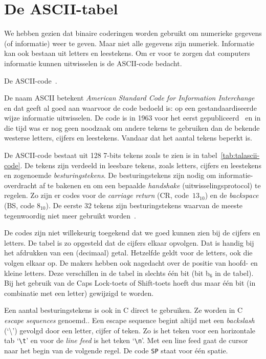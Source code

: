 \chapter{De ASCII-tabel}
\label{cha:asciitabel}
\thispagestyle{empty}

We hebben gezien dat binaire coderingen worden gebruikt om
numerieke gegevens (of informatie) weer te geven. Maar niet alle gegevens zijn numeriek.
Informatie kan ook bestaan uit letters en leestekens. Om er voor te zorgen dat
computers informatie kunnen uitwisselen is de ASCII-code bedacht.

\begin{table}[!p]
\caption{De ASCII-code~\cite{eijkhout2010ascii}.}
\label{tab:talascii-code}

\resizebox{\textwidth}{!}{}

\end{table}

De naam ASCII betekent \textsl{American Standard Code for Information Interchange} en
dat geeft al goed aan waarvoor de code bedoeld is: op een gestandaardiseerde wijze
informatie uitwisselen. De code is in 1963 voor het eerst gepubliceerd~\cite{asa1963ascii}
en in die tijd
was er nog geen noodzaak om andere tekens te gebruiken dan de bekende westerse letters,
cijfers en leestekens. Vandaar dat het aantal tekens beperkt is.

De ASCII-code bestaat uit 128 7-bits tekens zoals te zien is in
tabel~\ref{tab:talascii-code}. De tekens zijn verdeeld in leesbare tekens, zoals letters,
cijfers en leestekens en zogenoemde \textsl{besturingstekens}. De besturingstekens zijn nodig
om informatie-overdracht af te bakenen en om een bepaalde \textsl{handshake} 
(uitwisselingsprotocol) te regelen.
Zo zijn er codes voor de \textsl{carriage return} (CR, code~$13_{10}$) en de
\textsl{backspace} (BS, code $8_{10}$). De eerste 32 tekens zijn besturingstekens
waarvan de meeste tegenwoordig niet meer gebruikt worden~\cite{maini2007digital}.

De codes zijn niet willekeurig toegekend dat we goed kunnen zien bij de cijfers
en letters. De tabel is zo opgesteld dat de cijfers elkaar opvolgen. Dat is
handig bij het afdrukken van een (decimaal) getal.
Hetzelfde geldt voor de letters, ook die volgen elkaar op. De makers hebben ook nagedacht
over de positie van hoofd- en kleine letters. Deze verschillen in de tabel in slechts
\'{e}\'{e}n bit (bit b$_{6}$ in de tabel). Bij het gebruik van de Caps Lock-toets
of Shift-toets hoeft dus maar \'{e}\'{e}n bit (in combinatie met een letter) gewijzigd
te worden.

Een aantal besturingstekens is ook in C direct te gebruiken. Ze worden in C
\textsl{escape sequences} genoemd.. Een escape sequence
begint altijd met een \textsl{backslash} (`\textbackslash')
gevolgd door een letter, cijfer of teken. Zo is het teken voor een horizontale
tab `\texttt{\textbackslash t}' en voor de \textsl{line feed} is het teken
`\texttt{\textbackslash n}'. Met een line feed gaat de cursor naar het begin van
de volgende regel. De code \texttt{SP} staat voor één spatie.

